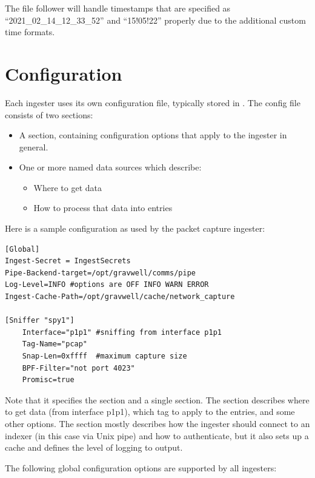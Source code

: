 The file follower will handle timestamps that are specified as ``2021\_02\_14\_12\_33\_52'' and ``15!05!22'' properly due to the additional custom time formats.


\section{Configuration}
\label{sec:global-config}

Each ingester uses its own configuration file, typically stored in
. The config file consists of two sections:

\begin{itemize}
\item
  A \code{[Global]} section, containing configuration options that
  apply to the ingester in general.
\item
  One or more named data sources which describe:
	\begin{itemize}
	\item Where to get data
	\item How to process that data into entries
	\end{itemize}
\end{itemize}

Here is a sample configuration as used by the packet capture ingester:

\begin{Verbatim}[breaklines=true]
[Global]
Ingest-Secret = IngestSecrets
Pipe-Backend-target=/opt/gravwell/comms/pipe
Log-Level=INFO #options are OFF INFO WARN ERROR
Ingest-Cache-Path=/opt/gravwell/cache/network_capture

[Sniffer "spy1"]
    Interface="p1p1" #sniffing from interface p1p1
    Tag-Name="pcap"
    Snap-Len=0xffff  #maximum capture size
    BPF-Filter="not port 4023"
    Promisc=true
\end{Verbatim}

Note that it specifies the \code{[Global]} section and a single
\code{[Sniffer]} section. The \code{[Sniffer]} section describes where to get
data (from interface p1p1), which tag to apply to the entries, and some
other options. The \code{[Global]} section mostly describes how the
ingester should connect to an indexer (in this case via Unix pipe) and
how to authenticate, but it also sets up a cache and defines the level
of logging to output.

The following global configuration options are supported by all
ingesters:

